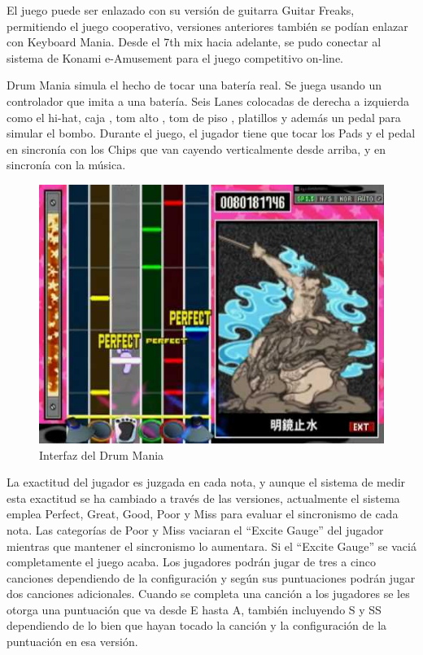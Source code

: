 \documentclass[a4paper,11pt,oneside]{book}
\begin{document}
El juego puede ser enlazado con su versión de guitarra Guitar Freaks, permitiendo el juego cooperativo, versiones anteriores también se podían enlazar con Keyboard Mania. Desde el 7th mix hacia adelante, se pudo conectar al sistema de Konami e-Amusement para el juego competitivo on-line.

Drum Mania simula el hecho de tocar una batería real. Se juega usando un controlador que imita a una batería. Seis \gls{Lanes} colocadas de derecha a izquierda como el hi-hat, caja , tom alto , tom de piso , platillos y además un pedal para simular el bombo. Durante el juego, el jugador tiene que tocar los \gls{Pads} y el pedal en sincronía con los \gls{Chips} que van cayendo verticalmente desde arriba, y en sincronía con la música.

\begin{figure}[H]
\begin{center}
\includegraphics[scale=0.3]{Imagenes/Drum_Mania_interface.jpeg}
\caption{Interfaz del Drum Mania}
\label{Interfaz del Drum Mania}
\end{center}
\end{figure}

La exactitud del jugador es juzgada en cada nota, y aunque el sistema de medir esta exactitud se ha cambiado a través de las versiones, actualmente el sistema emplea Perfect, Great, Good, Poor y Miss para evaluar el sincronismo de cada nota. Las categorías de Poor y Miss vaciaran el ``Excite Gauge'' del jugador mientras que mantener el sincronismo lo aumentara. Si el ``Excite Gauge'' se vaciá completamente el juego acaba. Los jugadores podrán jugar de tres a cinco canciones dependiendo de la configuración y según sus puntuaciones podrán jugar dos canciones adicionales. Cuando se completa una canción a los jugadores se les otorga una puntuación que va desde E hasta A, también incluyendo S y SS dependiendo de lo bien que hayan tocado la canción y la configuración de la puntuación en esa versión.
\end{document}
